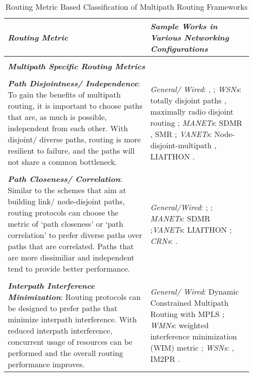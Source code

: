 \documentclass[10pt]{IEEEtran}
\begin{document}
\begin{table*}[!ht]
\centering
\scriptsize
\ssmall
\caption{Routing Metric Based Classification of Multipath Routing Frameworks}
\label{tab:metrics}
\begin{tabular}{p{11.8cm}p{5.9cm}}
\hline

\cellcolor[HTML]{EFEFEF}\textbf{\textit{Routing Metric}}
& \cellcolor[HTML]{EFEFEF}\textbf{\textit{Sample Works in Various Networking Configurations}}\\
\hline
\\

\multicolumn{2}{l}{\cellcolor[HTML]{EFEFEF} \textbf{\textit{Multipath Specific Routing Metrics}}}\\
\\

\textbf{\textit{Path Disjointness/ Independence}}: To gain the benefits of multipath routing, it is important to choose paths that are, as much is possible, independent from each other. With disjoint/ diverse paths, routing is more resilient to failure, and the paths will not share a common bottleneck. & \textit{General/ Wired}: \cite{sidhu1991finding}, \cite{guo2003link} ; \textit{WSNs}: totally disjoint paths \cite{waharte2006totally}, maximally radio disjoint routing \cite{maimour2008maximally}; \textit{MANETs}: SDMR \cite{galvez2008spatially}, SMR \cite{lee2001split}; \textit{VANETs}: Node-disjoint-multipath \cite{huang2009performance}, LIAITHON \cite{wang2012liaithon}.
\\

\\
\textit{\textbf{Path Closeness/ Correlation}}: Similar to the schemes that aim at building link/ node-disjoint paths, routing protocols can choose the metric of `path closeness' or `path correlation' to prefer diverse paths over paths that are correlated. Paths that are more dissimiliar and independent tend to provide better performance. & \textit{General/Wired}: \cite{ma2004new}; \cite{liao2011introducing}; \textit{MANETs}: SDMR \cite{galvez2008spatially};\newline \textit{VANETs}: LIAITHON \cite{wang2012liaithon}; \textit{CRNs}: \cite{beltagy2011new}.\\

\\
\textbf{\textit{Interpath Interference Minimization}}: Routing protocols can be designed to prefer paths that minimize interpath interference. With reduced interpath interference, concurrent usage of resources can be performed and the overall routing performance improves. & \textit{General/ Wired}: Dynamic Constrained Multipath Routing with MPLS \cite{seok2001dynamic} ; \textit{WMNs}: weighted interference minimization (WIM) metric \cite{tsai2007interference}; \textit{WSNs}: \cite{maimour2008maximally}, IM2PR \cite{radi2014im2pr}.\\


\end{tabular}
\end{table*}
\end{document}
